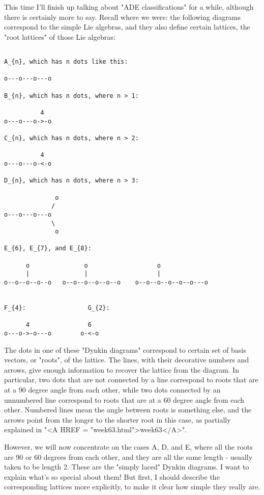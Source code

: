 


This time I'll finish up talking about "ADE classifications" for a
while, although there is certainly more to say.  Recall where we were:
the following diagrams correspond to the simple Lie algebras, and they
also define certain lattices, the "root lattices" of those Lie algebras:


\begin{verbatim}

A_{n}, which has n dots like this:

o---o---o---o

B_{n}, which has n dots, where n > 1:

          4
o---o---o->-o

C_{n}, which has n dots, where n > 2:

          4
o---o---o-<-o

D_{n}, which has n dots, where n > 3:

              o
             /
o---o---o---o
             \
              o

E_{6}, E_{7}, and E_{8}:

      o               o                   o
      |               |                   |
o--o--o--o--o   o--o--o--o--o--o    o--o--o--o--o--o---o


F_{4}:                 G_{2}:         

      4                6          
o---o->-o---o        o-<-o        
\end{verbatim}
    

The dots in one of these "Dynkin diagrams"
correspond to certain set of basis
vectors, or "roots", of the lattice.  
The lines, with their decorative
numbers and arrows, give enough information to recover the lattice from
the diagram.  In particular, two dots that are not connected by a line
correspond to roots that are at a 90 degree angle from each other, while
two dots connected by an unnumbered line correspond to roots that are at
a 60 degree angle from each other.  Numbered lines mean the angle
between roots is something else, and the arrows point from the longer to
the shorter root in this case, as partially explained in "<A HREF = "week63.html">week63</A>". 

However, we will now concentrate on the cases A, D, and E, where all the
roots are 90 or 60 degrees from each other, and they are all the same
length - usually taken to be length 2.  These are the "simply laced"
Dynkin diagrams.  I want to explain what's so special about them!  But
first, I should describe the corresponding lattices more explicitly, to
make it clear how simple they really are.  


